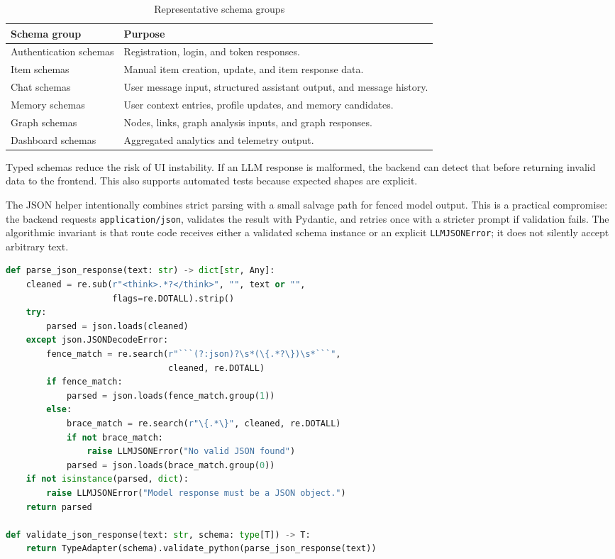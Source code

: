 \begin{table}[H]
\centering
\caption{Representative schema groups}
\label{tab:schema-groups}
\begin{tabular}{|p{}|p{}|}
\hline
\textbf{Schema group} & \textbf{Purpose}\\
\hline
Authentication schemas & Registration, login, and token responses.\\
\hline
Item schemas & Manual item creation, update, and item response data.\\
\hline
Chat schemas & User message input, structured assistant output, and message history.\\
\hline
Memory schemas & User context entries, profile updates, and memory candidates.\\
\hline
Graph schemas & Nodes, links, graph analysis inputs, and graph responses.\\
\hline
Dashboard schemas & Aggregated analytics and telemetry output.\\
\hline
\end{tabular}
\end{table}

Typed schemas reduce the risk of UI instability. If an LLM response is malformed, the backend can detect that before returning invalid data to the frontend. This also supports automated tests because expected shapes are explicit.

The JSON helper intentionally combines strict parsing with a small salvage path for fenced model output. This is a practical compromise: the backend requests \texttt{application/json}, validates the result with Pydantic, and retries once with a stricter prompt if validation fails. The algorithmic invariant is that route code receives either a validated schema instance or an explicit \texttt{LLMJSONError}; it does not silently accept arbitrary text.

\begin{lstlisting}[language=Python,caption={Structured LLM JSON parsing and schema validation},label={lst:llm-json}]
def parse_json_response(text: str) -> dict[str, Any]:
    cleaned = re.sub(r"<think>.*?</think>", "", text or "",
                     flags=re.DOTALL).strip()
    try:
        parsed = json.loads(cleaned)
    except json.JSONDecodeError:
        fence_match = re.search(r"```(?:json)?\s*(\{.*?\})\s*```",
                                cleaned, re.DOTALL)
        if fence_match:
            parsed = json.loads(fence_match.group(1))
        else:
            brace_match = re.search(r"\{.*\}", cleaned, re.DOTALL)
            if not brace_match:
                raise LLMJSONError("No valid JSON found")
            parsed = json.loads(brace_match.group(0))
    if not isinstance(parsed, dict):
        raise LLMJSONError("Model response must be a JSON object.")
    return parsed

def validate_json_response(text: str, schema: type[T]) -> T:
    return TypeAdapter(schema).validate_python(parse_json_response(text))
\end{lstlisting}

